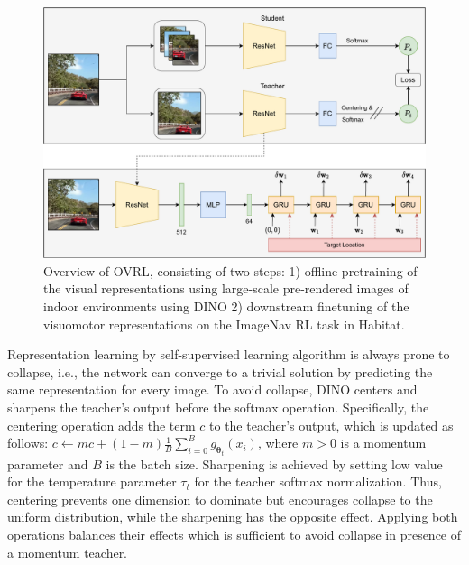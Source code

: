 \documentclass[letterpaper, 12pt]{book}
\theoremstyle{definition}
\theoremstyle{definition}
\theoremstyle{definition}
\theoremstyle{definition}
\theoremstyle{definition}
\newcommand{\vth}{\boldsymbol{\theta}}
\begin{document}
\begin{figure}[htbp]
\centering
\includegraphics[keepaspectratio,width=\textwidth,height=\textheight]{./img/ovrl.pdf}
\caption{\label{fig:orga4bf381}Overview of OVRL, consisting of two steps: 1) offline pretraining of the visual representations using large-scale pre-rendered images of indoor environments using DINO 2) downstream finetuning of the visuomotor representations on the ImageNav RL task in Habitat.}
\end{figure}


Representation learning by self-supervised learning algorithm is always prone to
collapse, i.e., the network can converge to a trivial solution by predicting the
same representation for every image. To avoid collapse, DINO centers and
sharpens the teacher’s output before the softmax operation. Specifically, the
centering operation adds the term \(c\) to the teacher’s output, which is
updated as follows: \(c\leftarrow mc+(1-m)\frac1B\sum_{i=0}^{B}g_{\vth_{t}}(x_{i})\),
where \(m>0\) is a momentum parameter and \(B\) is the batch size. Sharpening is
achieved by setting low value for the temperature parameter \(\tau_{t}\) for the
teacher softmax normalization. Thus, centering prevents one dimension to
dominate but encourages collapse to the uniform distribution, while the
sharpening has the opposite effect. Applying both operations balances their
effects which is sufficient to avoid collapse in presence of a momentum teacher.
\end{document}
